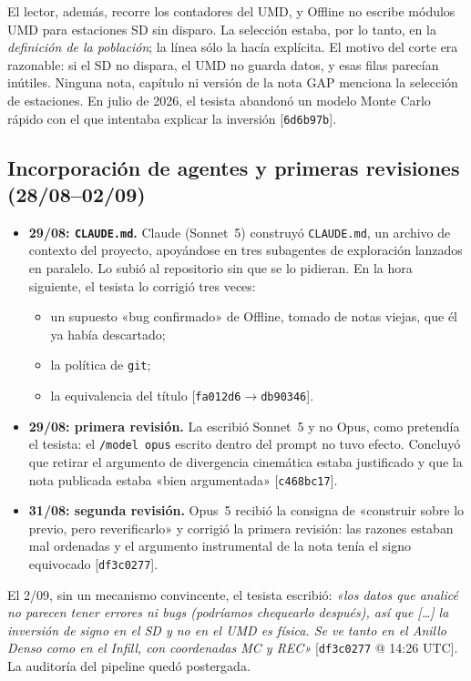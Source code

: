 \documentclass[11pt,a4paper]{article}
\newcommand{\ev}[1]{{\small\color{nota}[#1]}}   %
\newcommand{\code}[1]{\texttt{#1}}
\begin{document}
El lector, además, recorre los contadores del UMD, y Offline no escribe módulos UMD para estaciones SD sin
disparo. La selección estaba, por lo tanto, en la \emph{definición de la población}; la línea sólo la hacía
explícita. El motivo del corte era razonable: si el SD no dispara, el UMD no guarda datos, y esas filas
parecían inútiles. Ninguna nota, capítulo ni versión de la nota GAP menciona la selección de estaciones. En julio
de 2026, el tesista abandonó un modelo Monte Carlo rápido con el que intentaba explicar la inversión
\ev{\code{6d6b97b}}.

\subsection{Incorporación de agentes y primeras revisiones (28/08--02/09)}
\begin{itemize}
  \item \textbf{29/08: \code{CLAUDE.md}.} Claude (Sonnet~5) construyó \code{CLAUDE.md}, un archivo de
  contexto del proyecto, apoyándose en tres subagentes de exploración lanzados en paralelo. Lo subió al
  repositorio sin que se lo pidieran. En la hora siguiente, el tesista lo corrigió tres veces:
  \begin{itemize}
    \item un supuesto «bug confirmado» de Offline, tomado de notas viejas, que él ya había descartado;
    \item la política de \code{git};
    \item la equivalencia del título \ev{\code{fa012d6}$\to$\code{db90346}}.
  \end{itemize}
  \item \textbf{29/08: primera revisión.} La escribió Sonnet~5 y no Opus, como pretendía el tesista: el
  \code{/model opus} escrito dentro del prompt no tuvo efecto. Concluyó que retirar el argumento de
  divergencia cinemática estaba justificado y que la nota publicada estaba «bien argumentada»
  \ev{\code{c468bc17}}.
  \item \textbf{31/08: segunda revisión.} Opus~5 recibió la consigna de «construir sobre lo previo, pero
  reverificarlo» y corrigió la primera revisión: las razones estaban mal ordenadas y el argumento
  instrumental de la nota tenía el signo equivocado \ev{\code{df3c0277}}.
\end{itemize}

El 2/09, sin un mecanismo convincente, el tesista escribió: \emph{«los datos que analicé no parecen tener
errores ni bugs (podríamos chequearlo después), así que [\ldots] la inversión de signo en el SD y no en el
UMD es física. Se ve tanto en el Anillo Denso como en el Infill, con coordenadas MC y REC»}
\ev{\code{df3c0277} @ 14:26 UTC}. La auditoría del pipeline quedó postergada.
\end{document}
